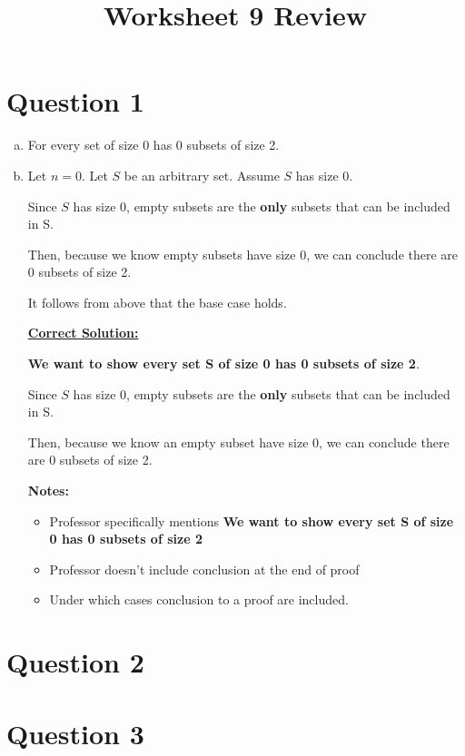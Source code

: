 \documentclass[12pt]{article}
\begin{document}
\title{Worksheet 9 Review}
\maketitle

\section*{Question 1}
\begin{enumerate}[a.]
    \item

    For every set of size 0 has 0 subsets of size 2.

    \item

    Let $n = 0$. Let $S$ be an arbitrary set. Assume $S$ has size 0.

    \bigskip

    Since $S$ has size 0, empty subsets are the \textbf{only} subsets that can be included
    in S.

    \bigskip

    Then, because we know empty subsets have size 0, we can conclude there are 0
    subsets of size 2.

    \bigskip

    It follows from above that the base case holds.


    \begin{mdframed}
        \underline{\textbf{Correct Solution:}}

        \color{red}
        \textbf{We want to show every set S of size 0 has 0 subsets of size 2}.
        \color{black}

        \bigskip

        Since $S$ has size 0, empty subsets are the \textbf{only} subsets that can be included
        in S.

        \bigskip

        Then, because we know an empty subset have size 0, we can conclude there are 0
        subsets of size 2.

    \end{mdframed}

    \textbf{Notes:}
    \begin{itemize}
        \item Professor specifically mentions \textbf{We want to show every set
        S of size 0 has 0 subsets of size 2}
        \item Professor doesn't include conclusion at the end of proof
        \item Under which cases conclusion to a proof are included.
    \end{itemize}

\end{enumerate}

\section*{Question 2}

\section*{Question 3}
\end{document}
